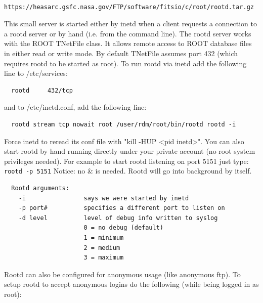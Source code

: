 \documentclass[11pt]{book}
\begin{document}
\begin{verbatim}
      https://heasarc.gsfc.nasa.gov/FTP/software/fitsio/c/root/rootd.tar.gz
\end{verbatim}

This small server is started either by inetd when a client requests a
connection to a rootd server or by hand (i.e. from the command line).
The rootd server works with the ROOT TNetFile class. It allows remote
access to ROOT database files in either read or write mode. By default
TNetFile assumes port 432 (which requires rootd to be started as root).
To run rootd via inetd add the following line to /etc/services:

\begin{verbatim}
  rootd     432/tcp
\end{verbatim}
and to /etc/inetd.conf, add the following line:

\begin{verbatim}
  rootd stream tcp nowait root /user/rdm/root/bin/rootd rootd -i
\end{verbatim}
Force inetd to reread its conf file with "kill -HUP <pid inetd>".
You can also start rootd by hand running directly under your private
account (no root system privileges needed). For example to start
rootd listening on port 5151 just type:   \verb+rootd -p 5151+
Notice: no \& is needed. Rootd will go into background by itself.

\begin{verbatim}
  Rootd arguments:
    -i                says we were started by inetd
    -p port#          specifies a different port to listen on
    -d level          level of debug info written to syslog
                      0 = no debug (default)
                      1 = minimum
                      2 = medium
                      3 = maximum
\end{verbatim}
Rootd can also be configured for anonymous usage (like anonymous ftp).
To setup rootd to accept anonymous logins do the following (while being
logged in as root):
\end{document}
